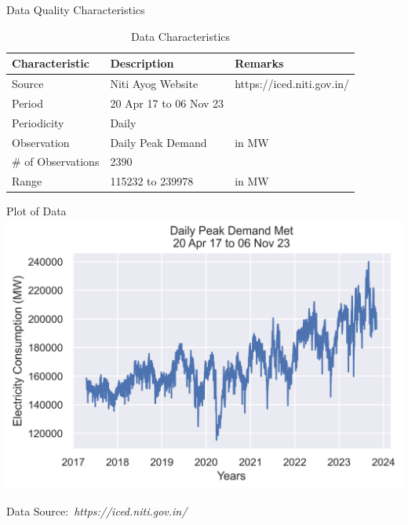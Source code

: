 \documentclass{beamer}
\newcommand{\credit}[1]{\par\hfill \footnotesize Data Source:~\itshape#1}
\begin{document}
\begin{frame}{Data Quality Characteristics}
\centering
 
 \begin{table}
     \centering
     
     \begin{tabular}{lll}
        Characteristic & Description & Remarks\\
        \toprule
        
         Source & Niti Ayog Website & https://iced.niti.gov.in/\\ \hline
          Period & 20 Apr 17 to  06 Nov 23 & \\  \hline
          Periodicity & Daily & \\  \hline
          Observation & Daily Peak Demand  &  in MW \\ \hline
          \# of Observations & 2390  & \\  \hline
          Range & 115232 to 239978  &  in MW \\ 
          \bottomrule
     \end{tabular}
     \caption{Data Characteristics}
     \label{tab:my_label}
 \end{table}

\end{frame}

\begin{frame}{Plot of Data}
\centering
\includegraphics[scale=.75]{images/Daily Peak.png}
\credit{https://iced.niti.gov.in/}
\end{frame}
\end{document}
